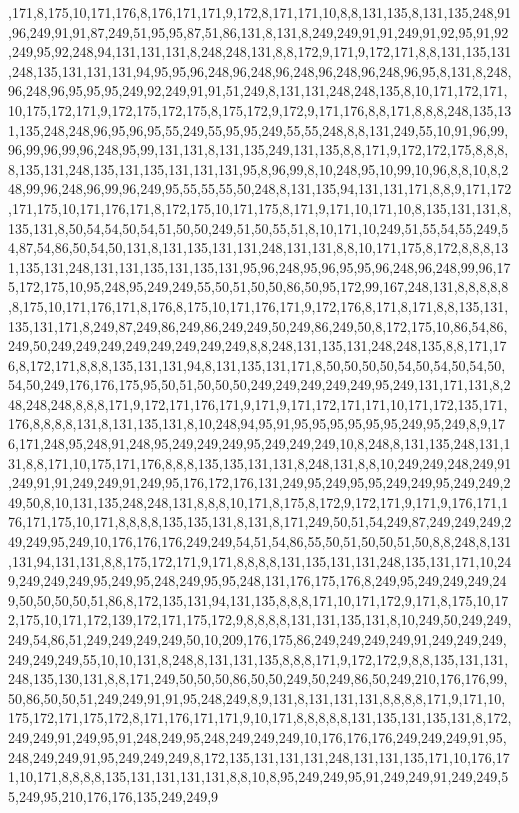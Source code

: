 ,171,8,175,10,171,176,8,176,171,171,9,172,8,171,171,10,8,8,131,135,8,131,135,248,91,96,249,91,91,87,249,51,95,95,87,51,86,131,8,131,8,249,249,91,91,249,91,92,95,91,92,249,95,92,248,94,131,131,131,8,248,248,131,8,8,172,9,171,9,172,171,8,8,131,135,131,248,135,131,131,131,94,95,95,96,248,96,248,96,248,96,248,96,248,96,95,8,131,8,248,96,248,96,95,95,95,249,92,249,91,91,51,249,8,131,131,248,248,135,8,10,171,172,171,10,175,172,171,9,172,175,172,175,8,175,172,9,172,9,171,176,8,8,171,8,8,8,248,135,131,135,248,248,96,95,96,95,55,249,55,95,95,249,55,55,248,8,8,131,249,55,10,91,96,99,96,99,96,99,96,248,95,99,131,131,8,131,135,249,131,135,8,8,171,9,172,172,175,8,8,8,8,135,131,248,135,131,135,131,131,131,95,8,96,99,8,10,248,95,10,99,10,96,8,8,10,8,248,99,96,248,96,99,96,249,95,55,55,55,50,248,8,131,135,94,131,131,171,8,8,9,171,172,171,175,10,171,176,171,8,172,175,10,171,175,8,171,9,171,10,171,10,8,135,131,131,8,135,131,8,50,54,54,50,54,51,50,50,249,51,50,55,51,8,10,171,10,249,51,55,54,55,249,54,87,54,86,50,54,50,131,8,131,135,131,131,248,131,131,8,8,10,171,175,8,172,8,8,8,131,135,131,248,131,131,135,131,135,131,95,96,248,95,96,95,95,96,248,96,248,99,96,175,172,175,10,95,248,95,249,249,55,50,51,50,50,86,50,95,172,99,167,248,131,8,8,8,8,8,8,175,10,171,176,171,8,176,8,175,10,171,176,171,9,172,176,8,171,8,171,8,8,135,131,135,131,171,8,249,87,249,86,249,86,249,249,50,249,86,249,50,8,172,175,10,86,54,86,249,50,249,249,249,249,249,249,249,249,8,8,248,131,135,131,248,248,135,8,8,171,176,8,172,171,8,8,8,135,131,131,94,8,131,135,131,171,8,50,50,50,50,54,50,54,50,54,50,54,50,249,176,176,175,95,50,51,50,50,50,249,249,249,249,249,95,249,131,171,131,8,248,248,248,8,8,8,171,9,172,171,176,171,9,171,9,171,172,171,171,10,171,172,135,171,176,8,8,8,8,131,8,131,135,131,8,10,248,94,95,91,95,95,95,95,95,95,249,95,249,8,9,176,171,248,95,248,91,248,95,249,249,249,95,249,249,249,10,8,248,8,131,135,248,131,131,8,8,171,10,175,171,176,8,8,8,135,135,131,131,8,248,131,8,8,10,249,249,248,249,91,249,91,91,249,249,91,249,95,176,172,176,131,249,95,249,95,95,249,249,95,249,249,249,50,8,10,131,135,248,248,131,8,8,8,10,171,8,175,8,172,9,172,171,9,171,9,176,171,176,171,175,10,171,8,8,8,8,135,135,131,8,131,8,171,249,50,51,54,249,87,249,249,249,249,249,95,249,10,176,176,176,249,249,54,51,54,86,55,50,51,50,50,51,50,8,8,248,8,131,131,94,131,131,8,8,175,172,171,9,171,8,8,8,8,131,135,131,131,248,135,131,171,10,249,249,249,249,95,249,95,248,249,95,95,248,131,176,175,176,8,249,95,249,249,249,249,50,50,50,50,51,86,8,172,135,131,94,131,135,8,8,8,171,10,171,172,9,171,8,175,10,172,175,10,171,172,139,172,171,175,172,9,8,8,8,8,131,131,135,131,8,10,249,50,249,249,249,54,86,51,249,249,249,249,50,10,209,176,175,86,249,249,249,249,91,249,249,249,249,249,249,55,10,10,131,8,248,8,131,131,135,8,8,8,171,9,172,172,9,8,8,135,131,131,248,135,130,131,8,8,171,249,50,50,50,86,50,50,249,50,249,86,50,249,210,176,176,99,50,86,50,50,51,249,249,91,91,95,248,249,8,9,131,8,131,131,131,8,8,8,8,171,9,171,10,175,172,171,175,172,8,171,176,171,171,9,10,171,8,8,8,8,8,131,135,131,135,131,8,172,249,249,91,249,95,91,248,249,95,248,249,249,249,10,176,176,176,249,249,249,91,95,248,249,249,91,95,249,249,249,8,172,135,131,131,131,248,131,131,135,171,10,176,171,10,171,8,8,8,8,135,131,131,131,131,8,8,10,8,95,249,249,95,91,249,249,91,249,249,55,249,95,210,176,176,135,249,249,9